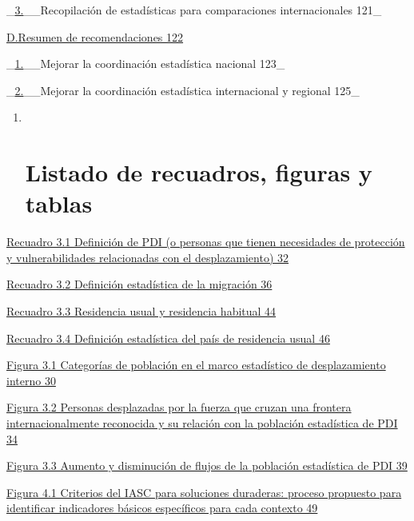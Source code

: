 \documentclass[
]{book}
\begin{document}
\_\protect\hyperlink{_Toc71834821}{3.}\_\_Recopilación de estadísticas para comparaciones internacionales 121\_

\protect\hyperlink{_Toc71834822}{D.Resumen de recomendaciones 122}

\_\protect\hyperlink{_Toc71834823}{1.}\_\_Mejorar la coordinación estadística nacional 123\_

\_\protect\hyperlink{_Toc71834824}{2.}\_\_Mejorar la coordinación estadística internacional y regional 125\_

\begin{enumerate}
\def\labelenumi{\arabic{enumi}.}
\item ~
  \hypertarget{listado-de-recuadros-figuras-y-tablas}{%
  \section{Listado de recuadros, figuras y tablas}\label{listado-de-recuadros-figuras-y-tablas}}
\end{enumerate}

\protect\hyperlink{_Toc70629913}{Recuadro 3.1 Definición de PDI (o personas que tienen necesidades de protección y vulnerabilidades relacionadas con el desplazamiento) 32}

\protect\hyperlink{_Toc70629914}{Recuadro 3.2 Definición estadística de la migración 36}

\href{/C:\%5CUsers\%5CMariana\%5CDocuments\%5C04-TRABAJO\%5CACNUR\%5CTraducciones\%5C04_Abril_2021\%5CACNUR\%2020210422-1\%5CIRIS\%202020.3486_src_EN_revised_140820_ESP_REV_mfa.docx\#_Toc70629915}{Recuadro 3.3 Residencia usual y residencia habitual 44}

\href{/C:\%5CUsers\%5CMariana\%5CDocuments\%5C04-TRABAJO\%5CACNUR\%5CTraducciones\%5C04_Abril_2021\%5CACNUR\%2020210422-1\%5CIRIS\%202020.3486_src_EN_revised_140820_ESP_REV_mfa.docx\#_Toc70629916}{Recuadro 3.4 Definición estadística del país de residencia usual 46}

\protect\hyperlink{_Toc70629917}{Figura 3.1 Categorías de población en el marco estadístico de desplazamiento interno 30}

\protect\hyperlink{_Toc70629918}{Figura 3.2 Personas desplazadas por la fuerza que cruzan una frontera internacionalmente reconocida y su relación con la población estadística de PDI 34}

\protect\hyperlink{_Toc70629919}{Figura 3.3 Aumento y disminución de flujos de la población estadística de PDI 39}

\protect\hyperlink{_Toc70629920}{Figura 4.1 Criterios del IASC para soluciones duraderas: proceso propuesto para identificar indicadores básicos específicos para cada contexto 49}
\end{document}

